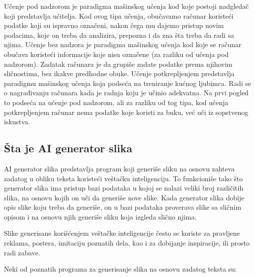 \documentclass[12pt, letterpaper]{article}
\begin{document}
  

Učenje pod nadzorom je paradigma mašinskog učenja kod koje postoji nadgledač koji predstavlja učitelja. Kod ovog tipa učenja, obučavamo računar koristeći podatke koji su ispravno označeni, nakon čega mu dajemo pristup novim podacima, koje on treba da analizira, prepozna i da zna šta treba da radi sa njima. Učenje bez nadzora je paradigma mašinskog učenja kod koje se računar obučava koristeći informacije koje nisu označene (za razliku od učenja pod nadzorom). Zadatak računara je da grupiše zadate podatke prema njihovim sličnostima, bez ikakve predhodne obuke. Učenje potkrepljenjem predstavlja paradigmu mašinskog učenja koja podseća na treniranje kućnog ljubimca. Radi se o nagrađivanju računara kada je radnja koju je učinio adekvatna. Na prvi pogled to podseća na učenje pod nadzorom, ali za razliku od tog tipa, kod učenja potkrepljenjem računar nema podatke koje koristi za buku, već uči iz sopstvenog iskustva. \cite{kljucDva} 

  

\subsection*{Šta je AI generator slika} 

AI generator slika predstavlja program koji generiše sliku na osnovu zahteva zadatog u obliku teksta koristeći veštačku inteligenciju. To funkcioniše tako što generator slika ima pristup bazi podataka u kojoj se nalazi veliki broj različitih slika, na osnovu kojih on uči da generiše nove slike. Kada generator slika dobije opis slike koju treba da generiše, on u bazi podataka proverava slike sa sličnim opisom i na osnovu njih generiše sliku koja izgleda slično njima.  

  

Slike generisane korišćenjem veštačke inteligencije često se koriste za pravljene reklama, postera, imitaciju poznatih dela, kao i za dobijanje inspiracije, ili prosto radi zabave.  

  

Neki od poznatih programa za generisanje slika na osnovu zadatog teksta su: 
\end{document}
